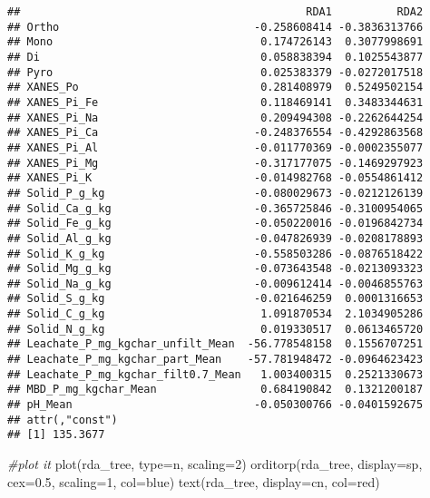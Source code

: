 \documentclass[
]{article}
\newenvironment{Shaded}{\begin{snugshade}}{\end{snugshade}}
\newcommand{\AttributeTok}[1]{\textcolor[rgb]{0.77,0.63,0.00}{#1}}
\newcommand{\CommentTok}[1]{\textcolor[rgb]{0.56,0.35,0.01}{\textit{#1}}}
\newcommand{\DecValTok}[1]{\textcolor[rgb]{0.00,0.00,0.81}{#1}}
\newcommand{\FloatTok}[1]{\textcolor[rgb]{0.00,0.00,0.81}{#1}}
\newcommand{\FunctionTok}[1]{\textcolor[rgb]{0.00,0.00,0.00}{#1}}
\newcommand{\NormalTok}[1]{#1}
\newcommand{\StringTok}[1]{\textcolor[rgb]{0.31,0.60,0.02}{#1}}
\begin{document}
\begin{verbatim}
##                                            RDA1          RDA2
## Ortho                              -0.258608414 -0.3836313766
## Mono                                0.174726143  0.3077998691
## Di                                  0.058838394  0.1025543877
## Pyro                                0.025383379 -0.0272017518
## XANES_Po                            0.281408979  0.5249502154
## XANES_Pi_Fe                         0.118469141  0.3483344631
## XANES_Pi_Na                         0.209494308 -0.2262644254
## XANES_Pi_Ca                        -0.248376554 -0.4292863568
## XANES_Pi_Al                        -0.011770369 -0.0002355077
## XANES_Pi_Mg                        -0.317177075 -0.1469297923
## XANES_Pi_K                         -0.014982768 -0.0554861412
## Solid_P_g_kg                       -0.080029673 -0.0212126139
## Solid_Ca_g_kg                      -0.365725846 -0.3100954065
## Solid_Fe_g_kg                      -0.050220016 -0.0196842734
## Solid_Al_g_kg                      -0.047826939 -0.0208178893
## Solid_K_g_kg                       -0.558503286 -0.0876518422
## Solid_Mg_g_kg                      -0.073643548 -0.0213093323
## Solid_Na_g_kg                      -0.009612414 -0.0046855763
## Solid_S_g_kg                       -0.021646259  0.0001316653
## Solid_C_g_kg                        1.091870534  2.1034905286
## Solid_N_g_kg                        0.019330517  0.0613465720
## Leachate_P_mg_kgchar_unfilt_Mean  -56.778548158  0.1556707251
## Leachate_P_mg_kgchar_part_Mean    -57.781948472 -0.0964623423
## Leachate_P_mg_kgchar_filt0.7_Mean   1.003400315  0.2521330673
## MBD_P_mg_kgchar_Mean                0.684190842  0.1321200187
## pH_Mean                            -0.050300766 -0.0401592675
## attr(,"const")
## [1] 135.3677
\end{verbatim}

\begin{Shaded}
\begin{Highlighting}[]
\CommentTok{\#plot it}
\FunctionTok{plot}\NormalTok{(rda\_tree, }\AttributeTok{type=}\StringTok{\textquotesingle{}n\textquotesingle{}}\NormalTok{, }\AttributeTok{scaling=}\DecValTok{2}\NormalTok{)}
\FunctionTok{orditorp}\NormalTok{(rda\_tree, }\AttributeTok{display=}\StringTok{\textquotesingle{}sp\textquotesingle{}}\NormalTok{, }\AttributeTok{cex=}\FloatTok{0.5}\NormalTok{, }\AttributeTok{scaling=}\DecValTok{1}\NormalTok{, }\AttributeTok{col=}\StringTok{\textquotesingle{}blue\textquotesingle{}}\NormalTok{)}
\FunctionTok{text}\NormalTok{(rda\_tree, }\AttributeTok{display=}\StringTok{\textquotesingle{}cn\textquotesingle{}}\NormalTok{, }\AttributeTok{col=}\StringTok{\textquotesingle{}red\textquotesingle{}}\NormalTok{)}
\end{Highlighting}
\end{Shaded}
\end{document}
